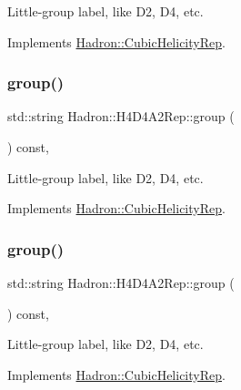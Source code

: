 Little-\/group label, like D2, D4, etc. 

Implements \mbox{\hyperlink{structHadron_1_1CubicHelicityRep_a101a7d76cd8ccdad0f272db44b766113}{Hadron\+::\+Cubic\+Helicity\+Rep}}.

\mbox{\label{structHadron_1_1H4D4A2Rep_a84c4465f2963fe5e6d241882ff28ddae}} 
\subsubsection{\texorpdfstring{group()}{group()}\hspace{0.1cm}{\footnotesize\ttfamily [3/5]}}
{\footnotesize\ttfamily std\+::string Hadron\+::\+H4\+D4\+A2\+Rep\+::group (\begin{DoxyParamCaption}{ }\end{DoxyParamCaption}) const\hspace{0.3cm}{\ttfamily [inline]}, {\ttfamily [virtual]}}

Little-\/group label, like D2, D4, etc. 

Implements \mbox{\hyperlink{structHadron_1_1CubicHelicityRep_a101a7d76cd8ccdad0f272db44b766113}{Hadron\+::\+Cubic\+Helicity\+Rep}}.

\mbox{\label{structHadron_1_1H4D4A2Rep_a84c4465f2963fe5e6d241882ff28ddae}} 
\subsubsection{\texorpdfstring{group()}{group()}\hspace{0.1cm}{\footnotesize\ttfamily [4/5]}}
{\footnotesize\ttfamily std\+::string Hadron\+::\+H4\+D4\+A2\+Rep\+::group (\begin{DoxyParamCaption}{ }\end{DoxyParamCaption}) const\hspace{0.3cm}{\ttfamily [inline]}, {\ttfamily [virtual]}}

Little-\/group label, like D2, D4, etc. 

Implements \mbox{\hyperlink{structHadron_1_1CubicHelicityRep_a101a7d76cd8ccdad0f272db44b766113}{Hadron\+::\+Cubic\+Helicity\+Rep}}.

\mbox{\label{structHadron_1_1H4D4A2Rep_a84c4465f2963fe5e6d241882ff28ddae}} 
